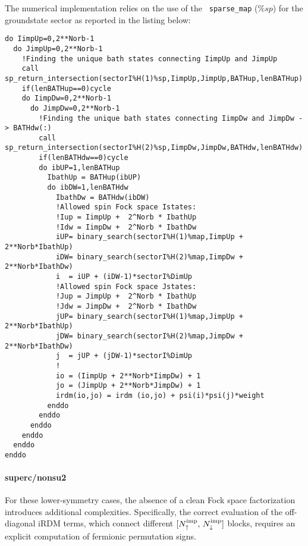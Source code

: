 \documentclass[edipack2.tex]{subfiles}
\begin{document}
The numerical implementation relies on the use of the {\tt
  sparse\_map} ($\%sp$) for the groundstate sector as reported in the listing below:  
\begin{lstlisting}[style=fstyle,numbers=none,basicstyle={\scriptsize\ttfamily}]
do IimpUp=0,2**Norb-1
  do JimpUp=0,2**Norb-1
    !Finding the unique bath states connecting IimpUp and JimpUp
    call sp_return_intersection(sectorI%H(1)%sp,IimpUp,JimpUp,BATHup,lenBATHup)
    if(lenBATHup==0)cycle
    do IimpDw=0,2**Norb-1
      do JimpDw=0,2**Norb-1
        !Finding the unique bath states connecting IimpDw and JimpDw -> BATHdw(:)
        call sp_return_intersection(sectorI%H(2)%sp,IimpDw,JimpDw,BATHdw,lenBATHdw)
        if(lenBATHdw==0)cycle
        do ibUP=1,lenBATHup
          IbathUp = BATHup(ibUP)
          do ibDW=1,lenBATHdw
            IbathDw = BATHdw(ibDW)
            !Allowed spin Fock space Istates:
            !Iup = IimpUp +  2^Norb * IbathUp
            !Idw = IimpDw +  2^Norb * IbathDw
            iUP= binary_search(sectorI%H(1)%map,IimpUp + 2**Norb*IbathUp)
            iDW= binary_search(sectorI%H(2)%map,IimpDw + 2**Norb*IbathDw)
            i  = iUP + (iDW-1)*sectorI%DimUp
            !Allowed spin Fock space Jstates:
            !Jup = JimpUp +  2^Norb * IbathUp
            !Jdw = JimpDw +  2^Norb * IbathDw
            jUP= binary_search(sectorI%H(1)%map,JimpUp + 2**Norb*IbathUp)
            jDW= binary_search(sectorI%H(2)%map,JimpDw + 2**Norb*IbathDw)
            j  = jUP + (jDW-1)*sectorI%DimUp
            ! 
            io = (IimpUp + 2**Norb*IimpDw) + 1
            jo = (JimpUp + 2**Norb*JimpDw) + 1
            irdm(io,jo) = irdm (io,jo) + psi(i)*psi(j)*weight
          enddo
        enddo
      enddo
    enddo
  enddo
enddo
\end{lstlisting}



\paragraph{{\bf superc/nonsu2}}
For these lower-symmetry cases, the absence of a clean Fock space 
factorization introduces additional complexities. Specifically, the 
correct evaluation of the off-diagonal iRDM terms, which connect 
different $[N^\mathrm{imp}_\uparrow,\,N^\mathrm{imp}_\downarrow]$ blocks, 
requires an explicit computation of fermionic permutation signs.
\end{document}

